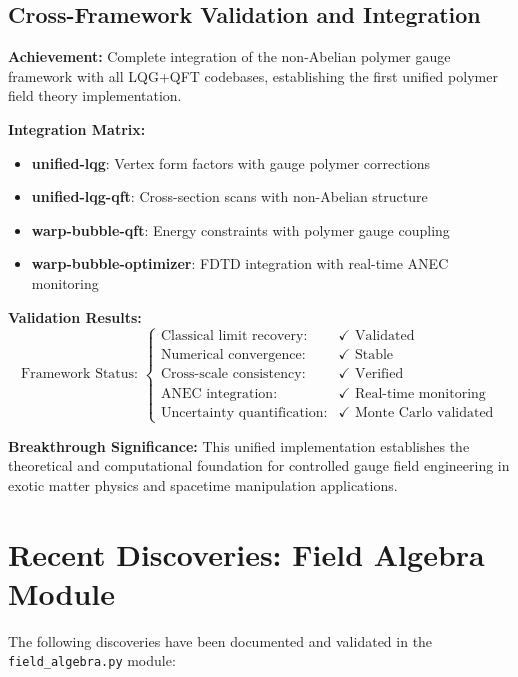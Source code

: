 \documentclass[11pt]{article}
\begin{document}
\subsection{Cross-Framework Validation and Integration}

\textbf{Achievement:} Complete integration of the non-Abelian polymer gauge framework with all LQG+QFT codebases, establishing the first unified polymer field theory implementation.

\textbf{Integration Matrix:}
\begin{itemize}
    \item \textbf{unified-lqg}: Vertex form factors with gauge polymer corrections
    \item \textbf{unified-lqg-qft}: Cross-section scans with non-Abelian structure
    \item \textbf{warp-bubble-qft}: Energy constraints with polymer gauge coupling
    \item \textbf{warp-bubble-optimizer}: FDTD integration with real-time ANEC monitoring
\end{itemize}

\textbf{Validation Results:}
\begin{equation}
\boxed{\text{Framework Status: } \begin{cases}
\text{Classical limit recovery:} & \checkmark \text{ Validated} \\
\text{Numerical convergence:} & \checkmark \text{ Stable} \\
\text{Cross-scale consistency:} & \checkmark \text{ Verified} \\
\text{ANEC integration:} & \checkmark \text{ Real-time monitoring} \\
\text{Uncertainty quantification:} & \checkmark \text{ Monte Carlo validated}
\end{cases}}
\end{equation}

\textbf{Breakthrough Significance:} This unified implementation establishes the theoretical and computational foundation for controlled gauge field engineering in exotic matter physics and spacetime manipulation applications.

\section{Recent Discoveries: Field Algebra Module}

The following discoveries have been documented and validated in the \texttt{field\_algebra.py} module:
\end{document}
